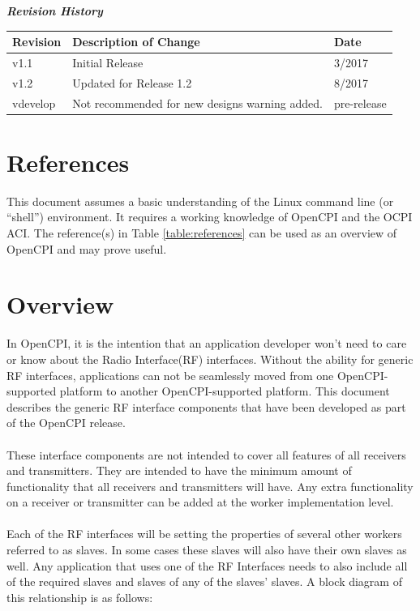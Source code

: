 	\begin{center}
	\textit{\textbf{Revision History}}
		\begin{table}[H]
		\label{table:revisions} %
      \begin{longtable}{|p{}
                        |p{}
                        |p{}|}
			\hline
			\rowcolor{blue}
			\textbf{Revision} & \textbf{Description of Change} & \textbf{Date} \\
		    \hline
		    v1.1 & Initial Release & 3/2017 \\
		    \hline
		    v1.2 & Updated for Release 1.2 & 8/2017 \\
		    \hline
        \color{red}vdevelop & Not recommended for new designs warning added. & \color{red}pre-release \\
		    \hline
			\end{longtable}
		\end{table}
	\end{center}

\newpage

\tableofcontents

\newpage

\section{References}

	This document assumes a basic understanding of the Linux command line (or ``shell'') environment. It requires a working knowledge of OpenCPI and the OCPI ACI.  The reference(s) in Table \ref{table:references} can be used as an overview of OpenCPI and may prove useful.


\newpage
\section{Overview}
In OpenCPI, it is the intention that an application developer won't need to care or know about the Radio Interface(RF) interfaces.  Without the ability for generic RF interfaces, applications can not be seamlessly moved from one OpenCPI-supported platform to another OpenCPI-supported platform.  This document describes the generic RF interface components that have been developed as part of the OpenCPI release.  \\ \\
These interface components are not intended to cover all features of all receivers and transmitters.  They are intended to have the minimum amount of functionality that all receivers and transmitters will have.  Any extra functionality on a receiver or transmitter can be added at the worker implementation level. \\ \\
Each of the RF interfaces will be setting the properties of several other workers referred to as slaves.  In some cases these slaves will also have their own slaves as well.  Any application that uses one of the RF Interfaces needs to also include all of the required slaves and slaves of any of the slaves' slaves.  A block diagram of this relationship is as follows:

